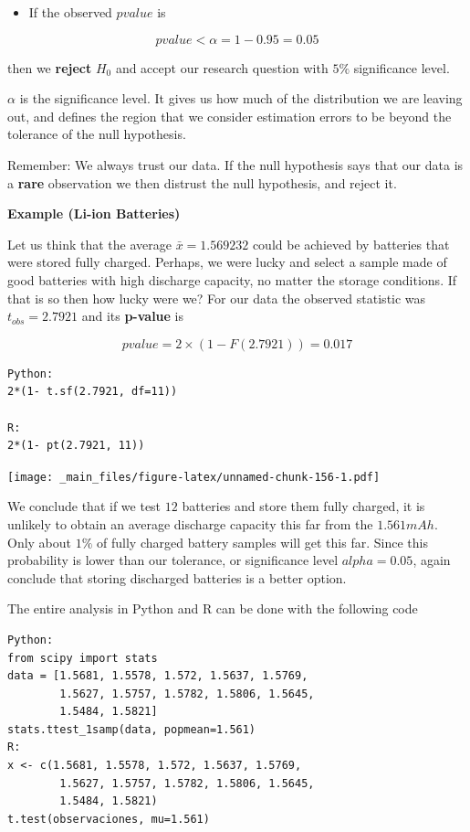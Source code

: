 \documentclass[
]{book}
\providecommand{\tightlist}{%
  \setlength{\itemsep}{0pt}\setlength{\parskip}{0pt}}
\begin{document}
\begin{itemize}
\tightlist
\item
  If the observed \(pvalue\) is
\end{itemize}

\[pvalue < \alpha =1-0.95=0.05\]

then we \textbf{reject} \(H_0\) and accept our research question with \(5\%\) significance level.

\(\alpha\) is the significance level. It gives us how much of the distribution we are leaving out, and defines the region that we consider estimation errors to be beyond the tolerance of the null hypothesis.

Remember: We always trust our data. If the null hypothesis says that our data is a \textbf{rare} observation we then distrust the null hypothesis, and reject it.

\textbf{Example (Li-ion Batteries)}

Let us think that the average \(\bar{x}=1.569232\) could be achieved by batteries that were stored fully charged. Perhaps, we were lucky and select a sample made of good batteries with high discharge capacity, no matter the storage conditions. If that is so then how lucky were we? For our data the observed statistic was \(t_{obs}=2.7921\) and its \textbf{p-value} is

\[pvalue=2\times (1-F(2.7921))=0.017\]

\begin{verbatim}
Python: 
2*(1- t.sf(2.7921, df=11))

R: 
2*(1- pt(2.7921, 11))
\end{verbatim}

\texttt{[image: \_main\_files/figure-latex/unnamed-chunk-156-1.pdf]}

We conclude that if we test \(12\) batteries and store them fully charged, it is unlikely to obtain an average discharge capacity this far from the \(1.561mAh\). Only about \(1\%\) of fully charged battery samples will get this far. Since this probability is lower than our tolerance, or significance level \(alpha=0.05\), again conclude that storing discharged batteries is a better option.

The entire analysis in Python and R can be done with the following code

\begin{verbatim}
Python:
from scipy import stats
data = [1.5681, 1.5578, 1.572, 1.5637, 1.5769,
        1.5627, 1.5757, 1.5782, 1.5806, 1.5645,
        1.5484, 1.5821]
stats.ttest_1samp(data, popmean=1.561)
R:
x <- c(1.5681, 1.5578, 1.572, 1.5637, 1.5769,
        1.5627, 1.5757, 1.5782, 1.5806, 1.5645,
        1.5484, 1.5821)
t.test(observaciones, mu=1.561)
\end{verbatim}
\end{document}
